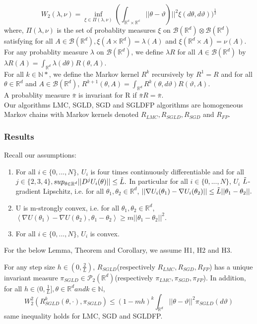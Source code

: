 $$W_2(\lambda, \nu) =\inf_{\xi \in \Pi(\lambda, \nu)}(\int_{\mathbb{\mathbb{R}^d \times \mathbb{R}^d}}||\theta-\vartheta)||^2 \xi(d\theta, d\vartheta))^{\frac{1}{2}}$$
where, $\Pi(\lambda, \nu)$ is the set of probablity measures $\xi$ on $\mathcal{B}(\mathbb{R}^d)\otimes\mathcal{B}(\mathbb{R}^d)$ satisfying for all $A \in \mathcal{B}(\mathbb{R}^d), \xi(A \times \mathbb{R}^d)= \lambda(A)$ and $\xi (\mathbb{R}^d \times A) = \nu(A)$.\\
For any probablity measure $\lambda$ on $\mathcal{B}(\mathbb{R}^d)$, we define $\lambda R$ for all $A \in \mathcal{B}(\mathbb{R}^d)$ by $\lambda R(A) = \int_{\mathbb{R}^d}\lambda(d\theta)R(\theta, A)$.\\
For all $k\in \mathbb{N}*$, we define the Markov kernel $R^k$ recursively by $R^1 = R$ and for all $\theta \in \mathbb{R}^d$ and $A \in \mathcal{B}(\mathbb{R}^d)$, $R^{k+1}(\theta, A) = \int_{\mathbb{R}^d}  R^k(\theta, d\vartheta)R(\vartheta, A).$\\
A probablity measure $\bar{\pi}$ is invariant for R if $\bar{\pi}R = \bar{\pi}$.\\
Our algorithms LMC, SGLD, SGD and SGLDFP algorithms are homogeneous Markov chains with Markov kernels denoted $R_{LMC}, R_{SGLD}, R_{SGD}$ and $R_{FP}$.

\subsubsection{Results}
Recall our assumptions:
\begin{enumerate}[label={\bf H\arabic*}]
    \item For all $i \in \{0,...,N\}, \ U_i$ is four times continuously differentiable and for all $j \in \{2, 3, 4\},$$sup_{\theta \in \mathbb{R}^d}||D^j U_i(\theta)||\leq \Tilde{L}.$ In particular for all $i\in \{0, ..., N\}$, $U_i$ $\Tilde{L}$-gradient Lipschitz, i.e. for all $\theta_1, \theta_2\in \mathbb{R}^d$, $||\nabla U_i(\theta_1) - \nabla U_i (\theta_2)|| \leq \Tilde{L}||\theta_1 - \theta_2||.$
    \item U is m-strongly convex, i.e. for all $\theta_1, \theta_2 \in \mathbb{R}^d$,$\left< \nabla U(\theta_1) - \nabla U(\theta_2), \theta_1 - \theta_2\right>\geq m ||\theta_1 - \theta_2||^2.$
    \item For all $i\in\{0,...,N\}$, $U_i$ is convex.
\end{enumerate}
For the below Lemma, Theorem and Corollary, we assume H1, H2 and H3.
\begin{lemma}
For any step size $h \in (0, \frac{2}{L})$, $R_{SGLD}$(respectively $R_{LMC}, R_{SGD}, R_{FP}$) has a unique invariant measure $\pi_{SGLD}\in \mathcal{P}_2(\mathbb{R}^d)$(respectively $\pi_{LMC}, \pi_{SGD}, \pi_{FP}$). In addition, for all $h \in (0, \frac{1}{L}], \theta\in \mathbb{R}^d and k\in\mathbb{N}$,
$$W_2^2(R_{SGLD}^k(\theta, \cdot), \pi_{SGLD})\leq(1-mh)^k\int_{\mathbb{R}^d}||\theta-\vartheta||^2\pi_{SGLD}(d\vartheta)$$
same inequality holds for LMC, SGD and SGLDFP.
\end{lemma}

